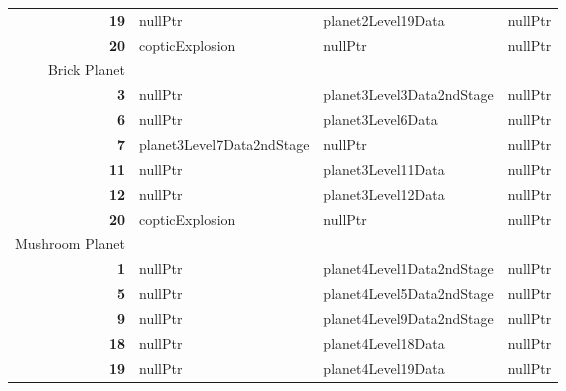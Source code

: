 \begin{figure}[H]
{\begin{adjustbox}{width=\textwidth}
\begin{tabular}{rlll}
      \textbf{19} & nullPtr\index{nullPtr}                   & planet2Level19Data\index{planet2Level19Data}        & nullPtr\index{nullPtr}       \\
      \textbf{20} & copticExplosion\index{copticExplosion}           & nullPtr\index{nullPtr}                   & nullPtr\index{nullPtr}       \\
\toprule
  Brick Planet\\
\midrule
       \textbf{3} & nullPtr\index{nullPtr}                   & planet3Level3Data2ndStage\index{planet3Level3Data2ndStage} & nullPtr\index{nullPtr}       \\
       \textbf{6} & nullPtr\index{nullPtr}                   & planet3Level6Data\index{planet3Level6Data}         & nullPtr\index{nullPtr}       \\
       \textbf{7} & planet3Level7Data2ndStage\index{planet3Level7Data2ndStage} & nullPtr\index{nullPtr}                   & nullPtr\index{nullPtr}       \\
      \textbf{11} & nullPtr\index{nullPtr}                   & planet3Level11Data\index{planet3Level11Data}        & nullPtr\index{nullPtr}       \\
      \textbf{12} & nullPtr\index{nullPtr}                   & planet3Level12Data\index{planet3Level12Data}        & nullPtr\index{nullPtr}       \\
      \textbf{20} & copticExplosion\index{copticExplosion}           & nullPtr\index{nullPtr}                   & nullPtr\index{nullPtr}       \\
\addlinespace
\toprule
   Mushroom Planet \\
\midrule
       \textbf{1} & nullPtr\index{nullPtr}         & planet4Level1Data2ndStage\index{planet4Level1Data2ndStage} & nullPtr\index{nullPtr}       \\
       \textbf{5} & nullPtr\index{nullPtr}         & planet4Level5Data2ndStage\index{planet4Level5Data2ndStage} & nullPtr\index{nullPtr}       \\
       \textbf{9} & nullPtr\index{nullPtr}         & planet4Level9Data2ndStage\index{planet4Level9Data2ndStage} & nullPtr\index{nullPtr}       \\
      \textbf{18} & nullPtr\index{nullPtr}         & planet4Level18Data\index{planet4Level18Data}        & nullPtr\index{nullPtr}       \\
      \textbf{19} & nullPtr\index{nullPtr}         & planet4Level19Data\index{planet4Level19Data}        & nullPtr\index{nullPtr}       \\

\end{tabular}
\end{adjustbox}}
\end{figure}
